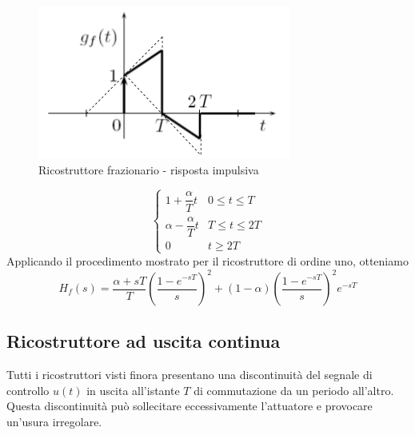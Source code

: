 \documentclass[a4paper]{report}
\begin{document}
\begin{figure}[!h]
  \begin{center}
    \includegraphics[scale=0.5]{./figures/ricostruttoreFrazionario01.png}
    \caption{Ricostruttore frazionario - risposta
      impulsiva}\label{fig:ricostruttoreFrazionario01} 
  \end{center}
\end{figure}
\begin{equation}
\left\{
\begin{array}{ll}
  1 + \dfrac{\alpha}{T}t & 0 \leq t \leq T\\
  \alpha - \dfrac{\alpha}{T}t & T \leq t \leq 2T\\
  0 & t \geq 2T
\end{array}
\right.
\end{equation}
Applicando il procedimento mostrato per il ricostruttore di ordine
uno, otteniamo
\begin{equation}
  H_f(s) = \dfrac{\alpha + sT}{T}\left( \dfrac{1 -
    e^{-sT}}{s}\right)^2 + (1 - \alpha)\left( \dfrac{1 -
    e^{-sT}}{s}\right)^2 e^{-sT}
\end{equation}

\subsection{Ricostruttore ad uscita continua}
Tutti i ricostruttori visti finora presentano una discontinuit\`a  del
segnale di controllo $u(t)$ in uscita all'istante $T$ di commutazione
da un periodo all'altro. Questa discontinuit\`a pu\`o sollecitare
eccessivamente l'attuatore e provocare un'usura irregolare.
\end{document}
